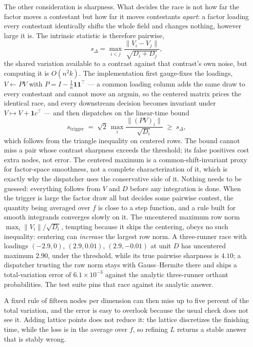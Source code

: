 \documentclass[11pt]{article}
\begin{document}
The other consideration is sharpness. What decides the race is not how
far the factor moves a contestant but how far it moves contestants
\emph{apart}: a factor loading every contestant identically shifts the
whole field and changes nothing, however large it is. The intrinsic
statistic is therefore pairwise,
\[
s_{\Delta}=\max_{i<j}\frac{\lVert V_i-V_j\rVert}{\sqrt{D_i+D_j}},
\]
the shared variation available to a contrast against that contrast's own
noise, but computing it is $O(n^2 k)$. The implementation first
gauge-fixes the loadings, $V\leftarrow PV$ with
$P=I-\tfrac1n\mathbf{1}\mathbf{1}^{\top}$ --- a common loading column
adds the same draw to every contestant and cannot move an argmin, so the
centered matrix prices the identical race, and every downstream decision
becomes invariant under $V\mapsto V+\mathbf{1}c^{\top}$ --- and then
dispatches on the linear-time bound
\[
s_{\mathrm{trigger}}\;=\;\sqrt2\,
\max_i \frac{\lVert (PV)_i\rVert}{\sqrt{D_i}}\;\ge\;s_{\Delta},
\]
which follows from the triangle inequality on centered rows. The bound
cannot miss a pair whose contrast sharpness exceeds the threshold; its
false positives cost extra nodes, not error. The centered maximum is a
common-shift-invariant proxy for factor-space smoothness, not a complete
characterization of it, which is exactly why the dispatcher uses the
conservative side of it. Nothing needs to be guessed: everything follows
from $V$ and $D$ before any integration is done. When the trigger is
large the factor draw all but decides some pairwise contest, the
quantity being averaged over $f$ is close to a step function, and a rule
built for smooth integrands converges slowly on it. The uncentered
maximum row norm $\max_i\lVert V_i\rVert/\sqrt{D_i}$, tempting because
it skips the centering, obeys no such inequality: centering can
\emph{increase} the largest row norm. A three-runner race with loadings
$(-2.9,0)$, $(2.9,0.01)$, $(2.9,-0.01)$ at unit $D$ has uncentered
maximum $2.90$, under the threshold, while its true pairwise sharpness
is $4.10$; a dispatcher trusting the raw norm stays with Gauss--Hermite
there and ships a total-variation error of $6.1\times10^{-3}$ against
the analytic three-runner orthant probabilities. The test suite pins
that race against its analytic answer.

A fixed rule of fifteen nodes per dimension can then miss up to five
percent of the total variation, and the error is easy to overlook because
the usual check does not see it. Adding lattice points does not reduce
it: the lattice discretizes the finishing time, while the loss is in the
average over $f$, so refining $L$ returns a stable answer that is stably
wrong.
\end{document}
